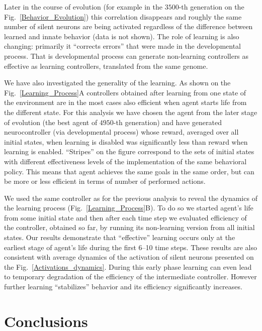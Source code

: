 \documentclass[letterpaper]{article}
\begin{document}
Later in the course of evolution (for example in the $3500$-th generation on the Fig.~\ref{Behavior_Evolution}) this correlation disappears and roughly the same number of silent neurons are being activated regardless of the difference between learned and innate behavior (data is not shown). The role of learning is also changing: primarily it ``corrects errors'' that were made in the developmental process. That is developmental process can generate non-learning controllers as effective as learning controllers, translated from the same genome. 

We have also investigated the generality of the learning. As shown on the Fig.~\ref{Learning_Process}A controllers obtained after learning from one state of the environment are in the most cases also efficient when agent starts life from the different state. For this analysis we have chosen the agent from the later stage of evolution (the best agent of $4950$-th generation) and have generated neurocontroller (via developmental process) whose reward, averaged over all initial states, when learning is disabled was significantly less than reward when learning is enabled. ``Stripes'' on the figure correspond to the sets of initial states with different effectiveness levels of the implementation of the same behavioral policy. This means that agent achieves the same goals in the same order, but can be more or less efficient in terms of number of performed actions. 

We used the same controller as for the previous analysis to reveal the dynamics of the learning process (Fig.~\ref{Learning_Process}B). To do so we started agent's life from some initial state and then after each time step we evaluated efficiency of the controller, obtained so far, by running its non-learning version from all initial states. Our results demonstrate that ``effective'' learning occurs only at the earliest stage of agent's life during the first 6--10 time steps. These results are also consistent with average dynamics of the activation of silent neurons presented on the Fig.~\ref{Activations_dynamics}. During this early phase learning can even lead to temporary degradation of the efficiency of the intermediate controller. However further learning ``stabilizes'' behavior and its efficiency significantly increases.

\section{Conclusions}

\footnotesize


\end{document}
